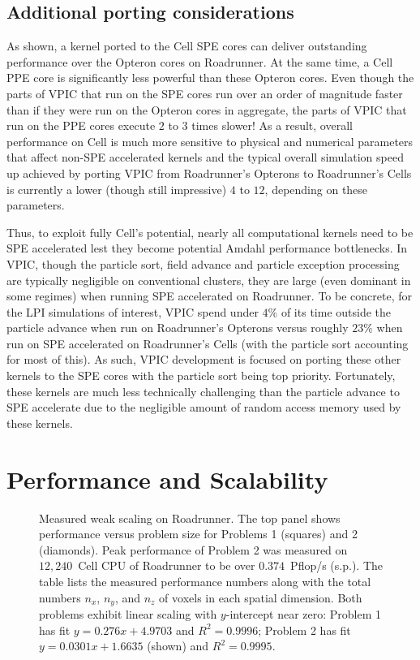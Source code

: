 \documentclass[journal,twoside]{IEEEtran}
\begin{document}
\subsection{Additional porting considerations}

As shown, a kernel ported to the Cell SPE cores can deliver
outstanding performance over the Opteron cores on Roadrunner.  At the
same time, a Cell PPE core is significantly less powerful than these
Opteron cores.  Even though the parts of VPIC that run on the SPE
cores run over an order of magnitude faster than if they were run on
the Opteron cores in aggregate, the parts of VPIC that run on the PPE
cores execute $2$ to $3$ times slower!  As a result, overall
performance on Cell is much more sensitive to physical and numerical
parameters that affect non-SPE accelerated kernels and the typical
overall simulation speed up achieved by porting VPIC from Roadrunner's
Opterons to Roadrunner's Cells is currently a lower (though still
impressive) $4$ to $12$, depending on these parameters.

Thus, to exploit fully Cell's potential, nearly all computational
kernels need to be SPE accelerated lest they become potential Amdahl
performance bottlenecks.  In VPIC, though the particle sort, field
advance and particle exception processing are typically negligible on
conventional clusters, they are large (even dominant in some regimes)
when running SPE accelerated on Roadrunner.  To be concrete, for the
LPI simulations of interest, VPIC spend under $4\%$ of its time
outside the particle advance when run on Roadrunner's Opterons versus
roughly $23\%$ when run on SPE accelerated on Roadrunner's Cells (with
the particle sort accounting for most of this).  As such, VPIC
development is focused on porting these other kernels to the SPE cores
with the particle sort being top priority.  Fortunately, these kernels
are much less technically challenging than the particle advance to SPE
accelerate due to the negligible amount of random access memory used
by these kernels.

\section{Performance and Scalability} \label{sec:performance}

\begin{figure}
\begin{center}
\caption{
Measured weak scaling on Roadrunner.  The top panel shows performance
versus problem size for Problems 1 (squares) and 2 (diamonds).  Peak
performance of Problem 2 was measured on $12,240$~Cell CPU of
Roadrunner to be over $0.374$~Pflop/s (s.p.).  The table lists the
measured performance numbers along with the total numbers $n_x$,
$n_y$, and $n_z$ of voxels in each spatial dimension.  Both problems
exhibit linear scaling with $y$-intercept near zero: Problem 1 has fit
$y=0.276x + 4.9703$ and $R^2=0.9996$; Problem 2 has fit $y=0.0301x +
1.6635$ (shown) and $R^2 = 0.9995$.}
\label{fig:weakscaling}
\end{center}
\end{figure}
\end{document}

